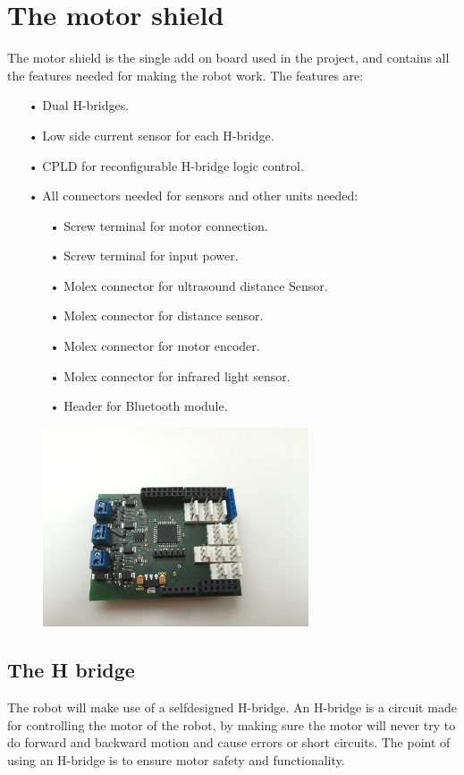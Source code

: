 \section{The motor shield}
The motor shield is the single add on board used in the project, and contains all the features needed for making the robot work.
The features are:
\begin{enumerate}
	\item[•]Dual H-bridges.
	\item[•]Low side current sensor for each H-bridge.
	\item[•]CPLD for reconfigurable H-bridge logic control.
	\item[•]All connectors needed for sensors and other units needed:
	\begin{enumerate}
		\item[•]Screw terminal for motor connection.
		\item[•]Screw terminal for input power.
		\item[•]Molex connector for ultrasound distance Sensor.
		\item[•]Molex connector for  distance sensor.
		\item[•]Molex connector for motor encoder.
		\item[•]Molex connector for infrared light sensor.
		\item[•]Header for Bluetooth module.
	\end{enumerate}
\end{enumerate}

\begin{figure}[!ht]
	\centering
	\includegraphics[width=0.7\textwidth]{figures/motorShield.jpg}
	\caption{}
	\label{Motorshield}
\end{figure}

\subsection{The H bridge}
The robot will make use of a selfdesigned H-bridge. An H-bridge is a circuit made for controlling the motor of the robot, by making sure the motor will never try to do forward and backward motion  and cause errors or short circuits. The point of using an H-bridge is to ensure motor safety and functionality.

